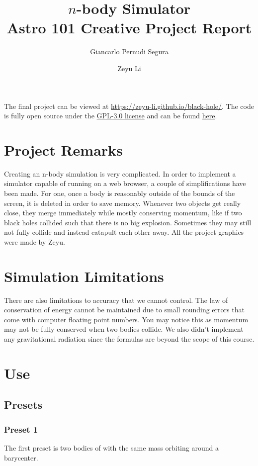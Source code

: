 \documentclass{article}
\title{%
	$n$-body Simulator \\
	\large{Astro 101 Creative Project Report}
}
\author[1]{Giancarlo Pernudi Segura}
\affil{pernudi@ualberta.ca}
\author[2]{Zeyu Li}
\affil{zeyu7@ualberta.ca}
\begin{document}
\maketitle

The final project can be viewed at \url{https://zeyu-li.github.io/black-hole/}. The code is fully open source under the \href{https://raw.githubusercontent.com/Zeyu-Li/black-hole/main/LICENSE}{GPL-3.0 license} and can be found \href{https://github.com/Zeyu-Li/black-hole}{here}.

\section{Project Remarks}
Creating an n-body simulation is very complicated. In order to implement a simulator capable of running on a web browser, a couple of simplifications have been made. For one, once a body is reasonably outside of the bounds of the screen, it is deleted in order to save memory. Whenever two objects get really close, they merge immediately while mostly conserving momentum, like if two black holes collided such that there is no big explosion. Sometimes they may still not fully collide and instead catapult each other away. All the project graphics were made by Zeyu.

\section{Simulation Limitations}
There are also limitations to accuracy that we cannot control. The law of conservation of energy cannot be maintained due to small rounding errors that come with computer floating point numbers. You may notice this as momentum may not be fully conserved when two bodies collide. We also didn't implement any gravitational radiation since the formulas are beyond the scope of this course.

\section{Use}
\subsection{Presets}
\subsubsection{Preset 1}
The first preset is two bodies of with the same mass orbiting around a barycenter.
\end{document}
